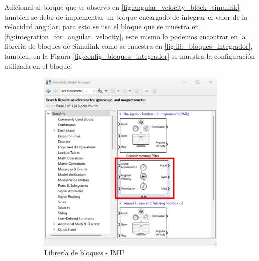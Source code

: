 Adicional al bloque que se observo en \ref{fig:angular_velocity_block_simulink} tambien se debe de implementar un bloque encargado de integrar el valor de la velocidad angular, para esto se usa el bloque que se muestra en \ref{fig:integration_for_angular_velocity}, este mismo lo podemos encontrar en la libreria de bloques de Simulink como se muestra en \ref{fig:lib_bloques_integrador}, tambien, en la Figura \ref{fig:config_bloques_integrador} se muestra la configuración utilizada en el bloque.
\newpage

\begin{figure}[htbp]
    \centering
    \begin{subfigure}[b]{0.35\textwidth}
        \centering
        \includegraphics[width=\textwidth]{fig/Capitulo5/Caso_de_estudio_IMU/Generador_de_archivos/libreria_de_bloques_IMU.pdf}
        \caption{Librería de bloques - IMU}
        \label{fig:lib_bloques_IMU}
    \end{subfigure}
    \hfill
    \begin{subfigure}[b]{0.35\textwidth}
        \centering

\end{subfigure}
\end{figure}
